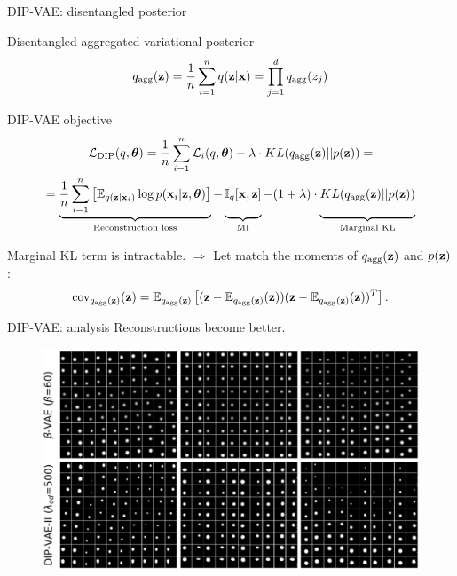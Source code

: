 \begin{frame}{DIP-VAE: disentangled posterior}
	\begin{block}{Disentangled aggregated variational posterior}
		\vspace{-0.3cm}
		\[
		q_{\text{agg}}(\mathbf{z}) = \frac{1}{n} \sum_{i=1}^n q(\mathbf{z} | \mathbf{x}) = \prod_{j=1}^d q_{\text{agg}}(z_j)
		\]
		\vspace{-0.6cm}
	\end{block}
	\begin{block}{DIP-VAE objective}
		\vspace{-0.7cm}
		{\small
			\begin{multline*}
			\cL_{\text{DIP}}(q, \btheta) = \frac{1}{n} \sum_{i=1}^n \cL_i(q, \btheta) -\lambda \cdot KL(q_{\text{agg}}(\bz) || p(\bz)) = \\
			= \underbrace{ \frac{1}{n} \sum_{i=1}^n \left[\bbE_{q(\bz | \bx_i)} \log p(\bx_i | \bz, \btheta)\right]}_{\text{Reconstruction loss}} - \underbrace{\vphantom{\sum_{i=1}^n} \bbI_{q} [\bx, \bz]}_{\text{MI}} - (1 + \lambda) \cdot \underbrace{\vphantom{\sum_{i=1}^n} KL(q_{\text{agg}}(\bz) || p(\bz))}_{\text{Marginal KL}}
			\end{multline*}
		}
		\vspace{-0.3cm}
	\end{block}
	Marginal KL term is intractable. $\Rightarrow$
	Let match the moments of $q_{\text{agg}}(\mathbf{z})$ and $p(\mathbf{z})$:
	\vspace{-0.3cm}
	\[
		\text{cov}_{q_{\text{agg}}(\mathbf{z})}(\mathbf{z}) = \mathbb{E}_{q_{\text{agg}}(\mathbf{z})} \left[ (\mathbf{z} - \mathbb{E}_{q_{\text{agg}}(\mathbf{z})}(\mathbf{z})) (\mathbf{z} - \mathbb{E}_{q_{\text{agg}}(\mathbf{z})}(\mathbf{z}))^T \right].
	\]
\end{frame}
\begin{frame}{DIP-VAE: analysis}
	Reconstructions become better.
	\begin{figure}
		\centering
		\includegraphics[width=\linewidth]{figs/dip-vae_1}
	\end{figure}

\end{frame}
